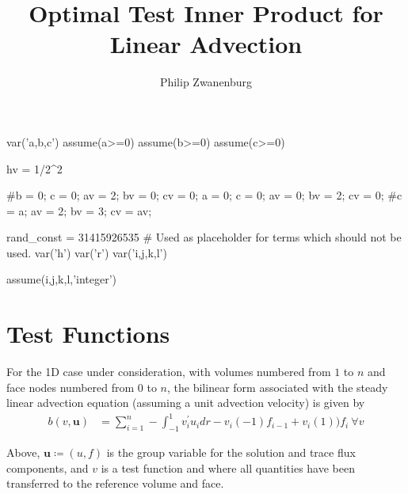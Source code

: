\documentclass{article}
\title{Optimal Test Inner Product for Linear Advection}
\author{Philip Zwanenburg}
\numberwithin{equation}{section}
\newcommand{\varg}[1]{\mathit{\bm{{#1}}}} %
\newcommand{\jump}[1]{{\llbracket #1\rrbracket}}
\begin{document}
\maketitle


\begin{sagesilent}
var('a,b,c')
assume(a>=0)
assume(b>=0)
assume(c>=0)

hv = 1/2^2

#b = 0; c = 0; av = 2; bv = 0; cv = 0;
a = 0; c = 0; av = 0; bv = 2; cv = 0;
#c = a; av = 2; bv = 3; cv = av;
\end{sagesilent}


\begin{sagesilent}
rand_const = 31415926535 # Used as placeholder for terms which should not be used.
var('h')
var('r')
var('i,j,k,l')

assume(i,j,k,l,'integer')
\end{sagesilent}

\section{Test Functions}

For the 1D case under consideration, with volumes numbered from $1$ to $n$ and face nodes numbered from $0$ to $n$, the
bilinear form associated with the steady linear advection equation (assuming a unit advection velocity) is given by
\begin{align} \label{eq:bilinear_adv}
b(v,\varg{u}) 
& = \sum_{i=1}^n -\int_{-1}^{1} v_i^{'} u_i dr - v_i(-1)f_{i-1}+v_{i}(1))f_i\ \forall v
\end{align}

Above, $\varg{u} \coloneqq (u,f)$ is the group variable for the solution and trace flux components, and $v$ is a test
function and where all quantities have been transferred to the reference volume and face.
\\~
\end{document}

